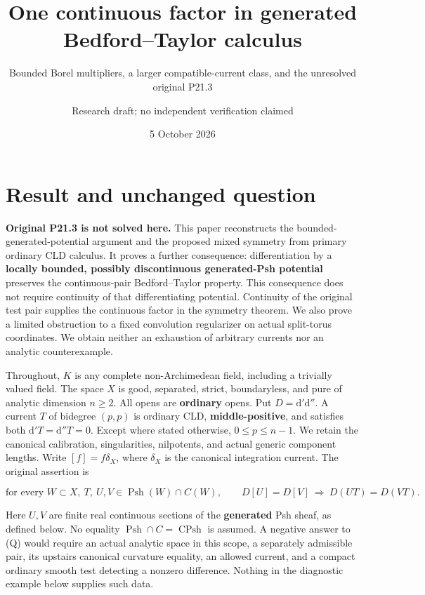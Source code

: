 \documentclass[
  11pt,
]{article}
\title{One continuous factor in generated Bedford--Taylor calculus}
\subtitle{Bounded Borel multipliers, a larger compatible-current class,
and the unresolved original P21.3}
\author{Research draft; no independent verification claimed}
\date{5 October 2026}
\begin{document}
\maketitle

\section{Result and unchanged
question}\label{result-and-unchanged-question}

\textbf{Original P21.3 is not solved here.} This paper reconstructs the
bounded-generated-potential argument and the proposed mixed symmetry
from primary ordinary CLD calculus. It proves a further consequence:
differentiation by a \textbf{locally bounded, possibly discontinuous
generated-Psh potential} preserves the continuous-pair Bedford--Taylor
property. This consequence does not require continuity of that
differentiating potential. Continuity of the original test pair supplies
the continuous factor in the symmetry theorem. We also prove a limited
obstruction to a fixed convolution regularizer on actual split-torus
coordinates. We obtain neither an exhaustion of arbitrary currents nor
an analytic counterexample.

Throughout, \(K\) is any complete non-Archimedean field, including a
trivially valued field. The space \(X\) is good, separated, strict,
boundaryless, and pure of analytic dimension \(n\geq2\). All opens are
\textbf{ordinary} opens. Put \(D=\mathrm d'\mathrm d''\). A current
\(T\) of bidegree \((p,p)\) is ordinary CLD, \textbf{middle-positive},
and satisfies both \(\mathrm d'T=\mathrm d''T=0\). Except where stated
otherwise, \(0\leq p\leq n-1\). We retain the canonical calibration,
singularities, nilpotents, and actual generic component lengths. Write
\([f]=f\delta_X\), where \(\delta_X\) is the canonical integration
current. The original assertion is

\[
 \text{for every }W\subset X,\ T,\ U,V\in\operatorname{Psh}(W)\cap C(W),
 \qquad D[U]=D[V]\ \Longrightarrow\ D(UT)=D(VT).                 \tag{Q}
\]

Here \(U,V\) are finite real continuous sections of the
\textbf{generated} Psh sheaf, as defined below. No equality
\(\operatorname{Psh}\cap C=\operatorname{CPsh}\) is assumed. A negative
answer to (Q) would require an actual analytic space in this scope, a
separately admissible pair, its upstairs canonical curvature equality,
an allowed current, and a compact ordinary smooth test detecting a
nonzero difference. Nothing in the diagnostic example below supplies
such data.
\end{document}

